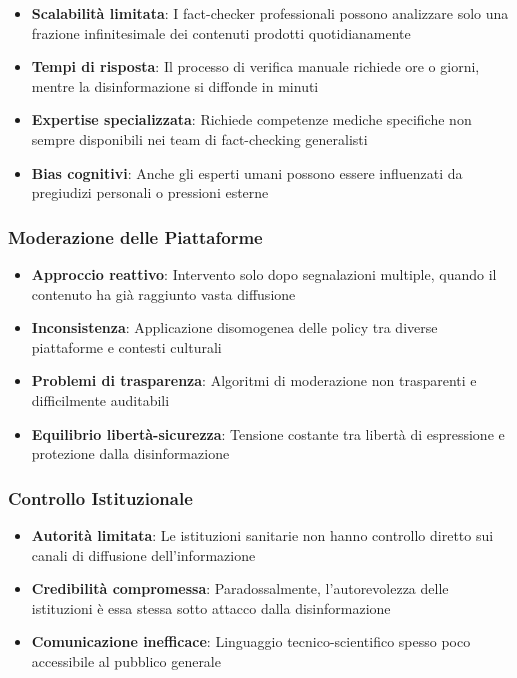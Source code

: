 \documentclass[12pt,a4paper]{report}
\begin{document}
\begin{itemize}
    \item \textbf{Scalabilità limitata}: I fact-checker professionali possono analizzare solo una frazione infinitesimale dei contenuti prodotti quotidianamente
    \item \textbf{Tempi di risposta}: Il processo di verifica manuale richiede ore o giorni, mentre la disinformazione si diffonde in minuti
    \item \textbf{Expertise specializzata}: Richiede competenze mediche specifiche non sempre disponibili nei team di fact-checking generalisti
    \item \textbf{Bias cognitivi}: Anche gli esperti umani possono essere influenzati da pregiudizi personali o pressioni esterne
\end{itemize}

\subsubsection{Moderazione delle Piattaforme}

\begin{itemize}
    \item \textbf{Approccio reattivo}: Intervento solo dopo segnalazioni multiple, quando il contenuto ha già raggiunto vasta diffusione
    \item \textbf{Inconsistenza}: Applicazione disomogenea delle policy tra diverse piattaforme e contesti culturali
    \item \textbf{Problemi di trasparenza}: Algoritmi di moderazione non trasparenti e difficilmente auditabili
    \item \textbf{Equilibrio libertà-sicurezza}: Tensione costante tra libertà di espressione e protezione dalla disinformazione
\end{itemize}

\subsubsection{Controllo Istituzionale}

\begin{itemize}
    \item \textbf{Autorità limitata}: Le istituzioni sanitarie non hanno controllo diretto sui canali di diffusione dell'informazione
    \item \textbf{Credibilità compromessa}: Paradossalmente, l'autorevolezza delle istituzioni è essa stessa sotto attacco dalla disinformazione
    \item \textbf{Comunicazione inefficace}: Linguaggio tecnico-scientifico spesso poco accessibile al pubblico generale
\end{itemize}
\end{document}
